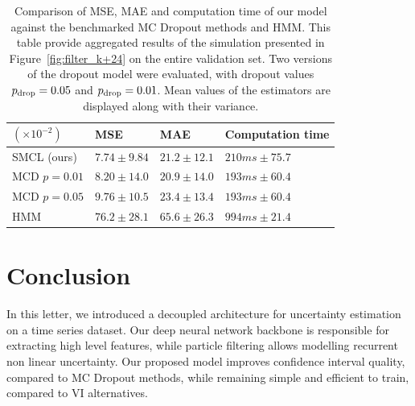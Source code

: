 \documentclass[journal]{IEEEtran}
\begin{document}
\begin{table}[htpb]
	\centering
	\caption{Comparison of MSE, MAE and computation time of our model against the benchmarked MC Dropout methods and HMM.
		This table provide aggregated results of the simulation presented in Figure~\ref{fig:filter_k+24} on the entire validation set.
		Two versions of the dropout model were evaluated, with dropout values $p_\textnormal{drop}=0.05$ and $p_\textnormal{drop}=0.01$.
		Mean values of the estimators are displayed along with their variance.}
	\label{tab:ci_comparison}
	\begin{tabular}{llll}
		\toprule
		$(\times 10^{-2})$ & MSE             & MAE             & Computation time  \\
		\toprule
		SMCL (ours)        & $7.74 \pm 9.84$ & $21.2 \pm 12.1$ & $210 ms \pm 75.7$ \\
		MCD $p=0.01$       & $8.20 \pm 14.0$ & $20.9 \pm 14.0$ & $193 ms \pm 60.4$ \\
		MCD $p=0.05$       & $9.76 \pm 10.5$ & $23.4 \pm 13.4$ & $193 ms \pm 60.4$ \\
		HMM                & $76.2 \pm 28.1$ & $65.6 \pm 26.3$ & $994 ms \pm 21.4$ \\
		\bottomrule
	\end{tabular}
\end{table}


\section{Conclusion}%
\label{sec:conclusion}

In this letter, we introduced a decoupled architecture for uncertainty estimation on a time series dataset.
Our deep neural network backbone is responsible for extracting high level features, while particle filtering allows modelling recurrent non linear uncertainty.
Our proposed model improves confidence interval quality, compared to MC Dropout methods, while remaining simple and efficient to train, compared to VI alternatives.
\end{document}

